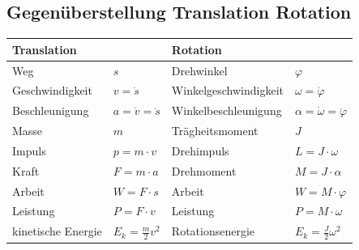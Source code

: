 \documentclass{article}
\begin{document}
	\subsection*{Gegenüberstellung Translation Rotation}
	\begin{center}
		\begin{tabular}{l l | l l}
			Translation & & Rotation & \\
			\hline
			Weg & $s$ & Drehwinkel & $\varphi$\\
			Geschwindigkeit & $v=\dot{s}$ & Winkelgeschwindigkeit & $\omega = \dot \varphi$\\
			Beschleunigung & $a=\dot{v}=\ddot{s}$ & Winkelbeschleunigung & $\alpha=\dot{\omega}=\ddot{\varphi}$\\
			Masse & $m$ & Trägheitsmoment & $J$\\
			Impuls & $p=m\cdot v$ & Drehimpuls & $L=J\cdot \omega$\\
			Kraft & $F=m\cdot a$ & Drehmoment & $M=J\cdot \alpha$\\
			Arbeit\footnotemark & $W=F\cdot s$ & Arbeit\footnotemark[1] & $W=M\cdot \varphi$\\
			Leistung\footnotemark[1] & $P=F\cdot v$ & Leistung\footnotemark[1] & $P=M\cdot\omega$\\
			kinetische Energie & $E_k=\frac{m}{2}v^2$ & Rotationsenergie & $E_k=\frac{J}{2}\omega^2$
		\end{tabular}
	\end{center}
	\newpage
	
\end{document}
